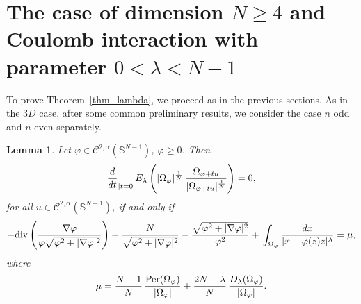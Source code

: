 \documentclass[10pt,reqno,english]{amsart}
\newcommand{\Sn}{\mathbb{S}^{N-1}}
\newtheorem{lemma}{Lemma}[section]
\theoremstyle{definition}
\numberwithin{equation}{section}
\begin{document}
\section{The case of dimension \texorpdfstring{$N\geq4$}{N>=4} and Coulomb interaction with parameter \texorpdfstring{$0<\lambda <N-1$}{0<lambda<N-1}}
\label{sec_further}



To prove Theorem~\ref{thm_lambda}, we proceed as in the previous sections. As in the $3D$ case, after some common preliminary results, we consider the case $n$ odd and $n$ even separately.


\begin{lemma}
\label{lemma1_4D}
Let $\varphi\in\mathcal C^{2,\alpha}(\Sn)$, $\varphi\ge0$. Then 
\[
{d \over dt}_{| t=0} \, E_\lambda \left( |\Omega_\varphi |^{1\over N} \, {\Omega_{\varphi +t u} \over |\Omega_{\varphi+tu}|^{1\over N}} \right) =0,
\]
for all $u\in \mathcal C^{2,\alpha}(\Sn)$, if and only if
\[
-\mathrm{div}\left(\frac{\nabla\varphi}{\varphi\sqrt{ \varphi^2 + |\nabla \varphi|^2}}\right)+\frac{N}{\sqrt{ \varphi^2 + |\nabla \varphi|^2}}-\frac{\sqrt{ \varphi^2 + |\nabla \varphi|^2}}{\varphi^2}+ \,  \int_{\Omega_\varphi}    {  d x\over |x - \varphi (z)   z|^\lambda}=\mu ,
\]
where
\[
\mu= {N-1 \over N} \, {{\mathrm{Per}} (\Omega_{\varphi }) \over  |\Omega_\varphi |} +{2N-\lambda \over N} \,\frac{D_\lambda(\Omega_\varphi) }{|\Omega_\varphi |}.
\]
\end{lemma}
\end{document}

